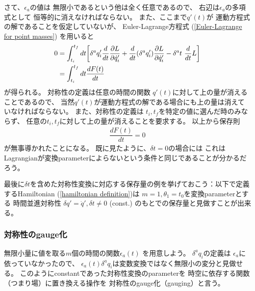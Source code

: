 さて、$\epsilon_a$の値は
無限小であるという他は全く任意であるので、
右辺は$\epsilon_a$の多項式として
恒等的に消えなければならない。
また、ここまで$q'(t)$が
運動方程式の解であることを仮定していないが、
Euler-Lagrange方程式
(\ref{Euler-Lagrange for point masses})
を用いると
\begin{align}
  0 &=
  \int_{t_i}^{t_f} dt
  \bigg[
    \delta^a q'_i
    \dfrac{d}{dt}
    \dfrac{\partial L}{\partial \dot{q}'_i}
  +
    \dfrac{d}{dt}
    (\delta^a q'_i)
    \dfrac{\partial L}{\partial \dot{q}'_i}
  -
    \delta^a t
    \ 
    \dfrac{d}{dt}
    L
  \bigg]
\notag\\&=
  \int_{t_i}^{t_f} dt
  \dfrac{dF(t)}{dt}
\end{align}
が得られる。
対称性の定義は任意の時間の関数
$q'(t)$に対して上の量が消えることであるので、
当然$q'(t)$が運動方程式の解である場合にも上の量は消えていなければならない。
また、対称性の定義は
$t_i, t_f$を特定の値に選んだ時のみならず、
任意の$t_i, t_f$に対して上の量が消えることを要求する。
以上から保存則
\begin{align}
  \dfrac{dF(t)}{dt} = 0
\end{align}
が無事導かれたことになる。
既に見たように、$\delta t = 0$の場合には
これはLagrangianが変換parameterによらないという条件と同じであることが分かるだろう。

最後に$\delta t$を含めた対称性変換に対応する保存量の例を挙げておこう：以下で定義するHamiltonian
(\ref{hamiltonian definition})は
$m=1, \theta_1 = t_0$を変換parameterとする
時間並進対称性
$\delta q' = \dot{q}', \delta t \neq 0$ (const.)
のもとでの保存量と見做すことが出来る。

\subsubsection{対称性のgauge化}

無限小量に値を取る$m$個の時間の関数$\epsilon_a (t)$
を用意しよう。
$\delta^a q_i$の定義は
$\epsilon_a$に依っていなかったので、
$\epsilon_a(t) \delta^a q_i$は変数変換ではなく無限小の変分と見做せる。
このようにconstantであった対称性変換のparameterを
時空に依存する関数（つまり場）に置き換える操作を
対称性のgauge化（gauging）と言う。

